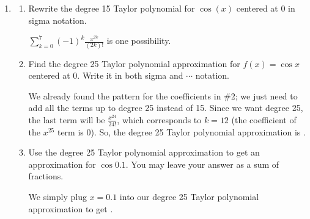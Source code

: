 \documentclass[main]{subfiles}
\begin{document}
\begin{enumerate}
\pspace{\newpage}

  \item 
  \begin{enumerate}
    \item 
    \begin{problem}[1in]
    Rewrite the degree 15 Taylor polynomial for $\cos(x)$ centered at 0 in
    sigma notation.
    \end{problem}
    
    \begin{solution}
    $\displaystyle \sum_{k=0}^7 (-1)^k \frac{x^{2k}}{(2k)!}$ is one
    possibility. 
    \end{solution}

    \item
    \begin{problem}[1.5in]
    Find the degree 25 Taylor polynomial approximation for $f(x) = \cos
    x$ centered at 0.  Write it in both sigma and $\cdots$ notation.
    \end{problem}

    \begin{solution}
    We already found the pattern for the coefficients in
    {\#2}; we just need to add all the terms
    up to degree 25 instead of 15.  Since we want degree 25, the last
    term will be $\frac{x^{24}}{24!}$, which corresponds to $k = 12$
    (the coefficient of the $x^{25}$ term is 0).  So, the degree 25
    Taylor polynomial approximation is .
    \end{solution}

    \item

    
    \begin{problem}[1.5in]
    Use the degree 25 Taylor polynomial approximation to get an
    approximation for $\cos 0.1$. You may leave your answer as a sum of fractions.
    \end{problem}

    \begin{solution}
    We simply plug $x = 0.1$ into our degree 25 Taylor polynomial
    approximation to get .


\end{solution}
\end{enumerate}
\end{enumerate}
\end{document}
